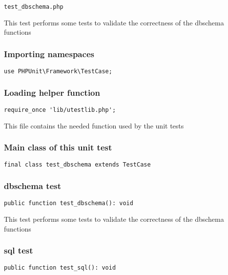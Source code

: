 \documentclass[a4paper]{article}
\begin{document}
\begin{lstlisting}
test_dbschema.php
\end{lstlisting}

This test performs some tests to validate the correctness
of the dbschema functions

\hypertarget{toc147}{}
\subsubsection{Importing namespaces}

\begin{lstlisting}
use PHPUnit\Framework\TestCase;
\end{lstlisting}

\hypertarget{toc148}{}
\subsubsection{Loading helper function}

\begin{lstlisting}
require_once 'lib/utestlib.php';
\end{lstlisting}

This file contains the needed function used by the unit tests

\hypertarget{toc149}{}
\subsubsection{Main class of this unit test}

\begin{lstlisting}
final class test_dbschema extends TestCase
\end{lstlisting}

\hypertarget{toc150}{}
\subsubsection{dbschema test}

\begin{lstlisting}
public function test_dbschema(): void
\end{lstlisting}

This test performs some tests to validate the correctness
of the dbschema functions

\hypertarget{toc151}{}
\subsubsection{sql test}

\begin{lstlisting}
public function test_sql(): void
\end{lstlisting}
\end{document}
